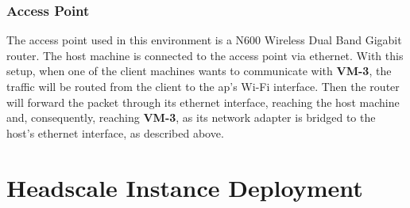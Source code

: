 \documentclass[11pt,twoside,a4paper]{report}
\begin{document}
\begin{table}[]
\centering
{}
\caption{Development Virtual Machines specification}
\label{table:vmspecs}
\end{table}

\subsubsection{Access Point}

The access point used in this environment is a N600 Wireless Dual Band Gigabit router. The host machine is connected to the access point via ethernet. With this setup, when one of the client machines wants to communicate with \textbf{VM-3}, the traffic will be routed from the client to the \ac{ap}'s Wi-Fi interface. Then the router will forward the packet through its ethernet interface, reaching the host machine and, consequently, reaching \textbf{VM-3}, as its network adapter is bridged to the host's ethernet interface, as described above.

\section{Headscale Instance Deployment}
\label{sec:devhs}
\end{document}
